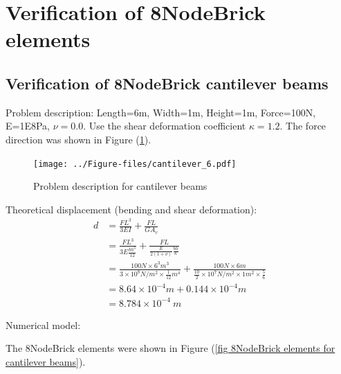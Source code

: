 \documentclass[fleqn,11pt]{article}
\begin{document}
\newpage



\section{Verification of 8NodeBrick elements}
\vskip 24pt

\subsection{Verification of 8NodeBrick cantilever beams}




Problem description: Length=6m, Width=1m, Height=1m, Force=100N, E=1E8Pa, $\nu=0.0$. Use the shear deformation coefficient $\kappa=1.2$. The force direction was shown in Figure (\ref{fig Problem description for cantilever beams}). 

\begin{figure}[H]
  \centering
  \texttt{[image: ../Figure-files/cantilever\_6.pdf]}
  \caption{Problem description for cantilever beams}
  \label{fig Problem description for cantilever beams}
\end{figure}


Theoretical displacement (bending and shear deformation):
\begin{equation}
  \begin{aligned}
  d &=\frac{FL^3}{3EI}+\frac{FL}{GA_v} \\
  &= \frac{FL^3}{3E\frac{bh^3}{12}}+\frac{FL}{\frac{E}{2(1+\nu)} \frac{bh}{\kappa}} \\ 
    &= \frac{100 N \times 6^3 m^3}{3\times 10^8 N/m^2 \times \frac{1}{12} m^4}+ 
    \frac{100 N\times 6 m}{\frac{10}{2} \times 10^7 N/m^2\times 1 m^2 \times \frac{5}{6}} \\ 
    &=8.64\times 10^{-4} m + 0.144 \times 10^{-4} m   \\
   & =8.784\times 10^{-4} \ m
   \end{aligned}
\end{equation}



Numerical model:



The 8NodeBrick elements were shown in Figure (\ref{fig 8NodeBrick elements for cantilever beams}).
\end{document}
